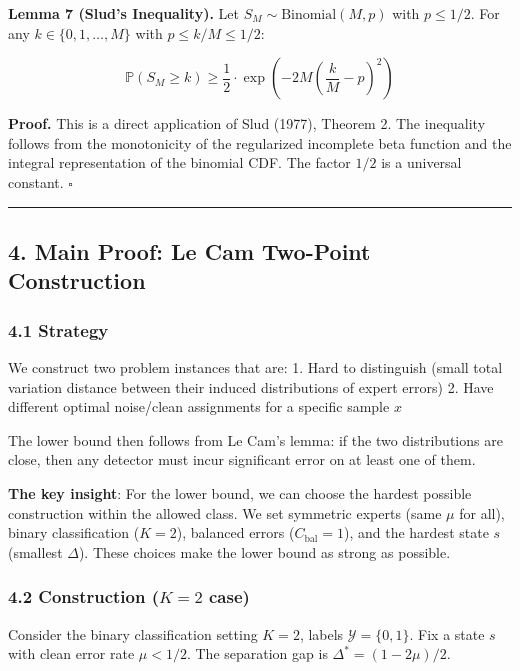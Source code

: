 \documentclass[
  12pt,
]{article}
\begin{document}
\textbf{Lemma 7 (Slud's Inequality).} Let
\(S_M \sim \text{Binomial}(M, p)\) with \(p \leq 1/2\). For any
\(k \in \{0,1,\dots,M\}\) with \(p \leq k/M \leq 1/2\):

\[\mathbb{P}(S_M \geq k) \geq \frac{1}{2} \cdot \exp\!\left(-2M\left(\frac{k}{M} - p\right)^2\right)\]

\textbf{Proof.} This is a direct application of Slud (1977), Theorem 2.
The inequality follows from the monotonicity of the regularized
incomplete beta function and the integral representation of the binomial
CDF. The factor \(1/2\) is a universal constant. \(\square\)

\begin{center}\rule{0.5\linewidth}{0.5pt}\end{center}

\subsection{4. Main Proof: Le Cam Two-Point
Construction}\label{main-proof-le-cam-two-point-construction}

\subsubsection{4.1 Strategy}\label{strategy}

We construct two problem instances that are: 1. Hard to distinguish
(small total variation distance between their induced distributions of
expert errors) 2. Have different optimal noise/clean assignments for a
specific sample \(x\)

The lower bound then follows from Le Cam's lemma: if the two
distributions are close, then any detector must incur significant error
on at least one of them.

\textbf{The key insight}: For the lower bound, we can choose the hardest
possible construction within the allowed class. We set symmetric experts
(same \(\mu\) for all), binary classification (\(K=2\)), balanced errors
(\(C_{\text{bal}} = 1\)), and the hardest state \(s\) (smallest
\(\Delta\)). These choices make the lower bound as strong as possible.

\subsubsection{\texorpdfstring{4.2 Construction (\(K=2\)
case)}{4.2 Construction (K=2 case)}}\label{construction-k2-case}

Consider the binary classification setting \(K=2\), labels
\(\mathcal{Y} = \{0,1\}\). Fix a state \(s\) with clean error rate
\(\mu < 1/2\). The separation gap is \(\Delta^* = (1-2\mu)/2\).
\end{document}
